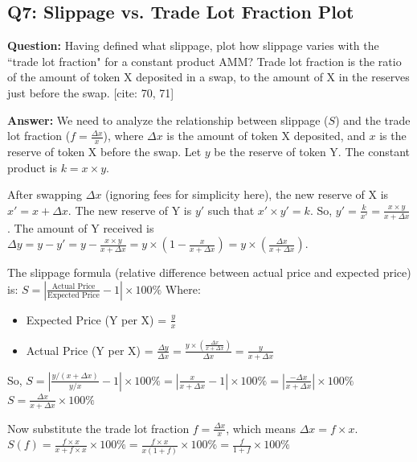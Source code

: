 \documentclass[12pt]{article}
\begin{document}
\subsection{Q7: Slippage vs. Trade Lot Fraction Plot}
\textbf{Question:} Having defined what slippage, plot how slippage varies with the ``trade lot fraction" for a constant product AMM? Trade lot fraction is the ratio of the amount of token X deposited in a swap, to the amount of X in the reserves just before the swap. [cite: 70, 71]

\textbf{Answer:} We need to analyze the relationship between slippage ($S$) and the trade lot fraction ($f = \frac{\Delta x}{x}$), where $\Delta x$ is the amount of token X deposited, and $x$ is the reserve of token X before the swap. Let $y$ be the reserve of token Y. The constant product is $k = x \times y$.

After swapping $\Delta x$ (ignoring fees for simplicity here), the new reserve of X is $x' = x + \Delta x$. The new reserve of Y is $y'$ such that $x' \times y' = k$. So, $y' = \frac{k}{x'} = \frac{x \times y}{x + \Delta x}$.
The amount of Y received is $\Delta y = y - y' = y - \frac{x \times y}{x + \Delta x} = y \times (1 - \frac{x}{x + \Delta x}) = y \times (\frac{\Delta x}{x + \Delta x})$.

The slippage formula (relative difference between actual price and expected price) is:
$S = \left| \frac{\text{Actual Price}}{\text{Expected Price}} - 1 \right| \times 100\%$
Where:
\begin{itemize}
    \item Expected Price (Y per X) = $\frac{y}{x}$
    \item Actual Price (Y per X) = $\frac{\Delta y}{\Delta x} = \frac{y \times (\frac{\Delta x}{x + \Delta x})}{\Delta x} = \frac{y}{x + \Delta x}$
\end{itemize}
So,
$S = \left| \frac{y / (x + \Delta x)}{y / x} - 1 \right| \times 100\% = \left| \frac{x}{x + \Delta x} - 1 \right| \times 100\% = \left| \frac{-\Delta x}{x + \Delta x} \right| \times 100\%$
$S = \frac{\Delta x}{x + \Delta x} \times 100\%$

Now substitute the trade lot fraction $f = \frac{\Delta x}{x}$, which means $\Delta x = f \times x$.
$S(f) = \frac{f \times x}{x + f \times x} \times 100\% = \frac{f \times x}{x(1 + f)} \times 100\% = \frac{f}{1 + f} \times 100\%$
\end{document}
